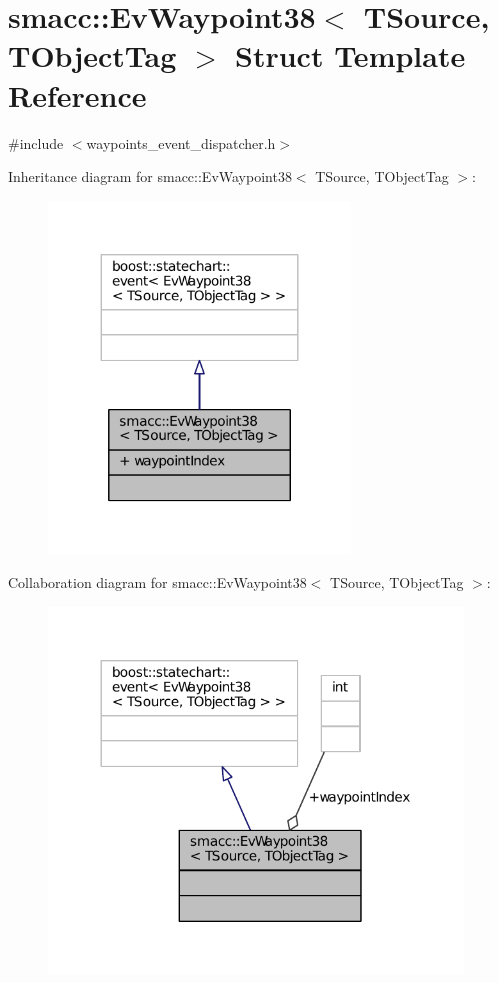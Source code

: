 \hypertarget{structsmacc_1_1EvWaypoint38}{}\section{smacc\+:\+:Ev\+Waypoint38$<$ T\+Source, T\+Object\+Tag $>$ Struct Template Reference}
\label{structsmacc_1_1EvWaypoint38}


{\ttfamily \#include $<$waypoints\+\_\+event\+\_\+dispatcher.\+h$>$}



Inheritance diagram for smacc\+:\+:Ev\+Waypoint38$<$ T\+Source, T\+Object\+Tag $>$\+:
\nopagebreak
\begin{figure}[H]
\begin{center}
\leavevmode
\includegraphics[width=227pt]{structsmacc_1_1EvWaypoint38__inherit__graph}
\end{center}
\end{figure}


Collaboration diagram for smacc\+:\+:Ev\+Waypoint38$<$ T\+Source, T\+Object\+Tag $>$\+:
\nopagebreak
\begin{figure}[H]
\begin{center}
\leavevmode
\includegraphics[width=312pt]{structsmacc_1_1EvWaypoint38__coll__graph}
\end{center}
\end{figure}
